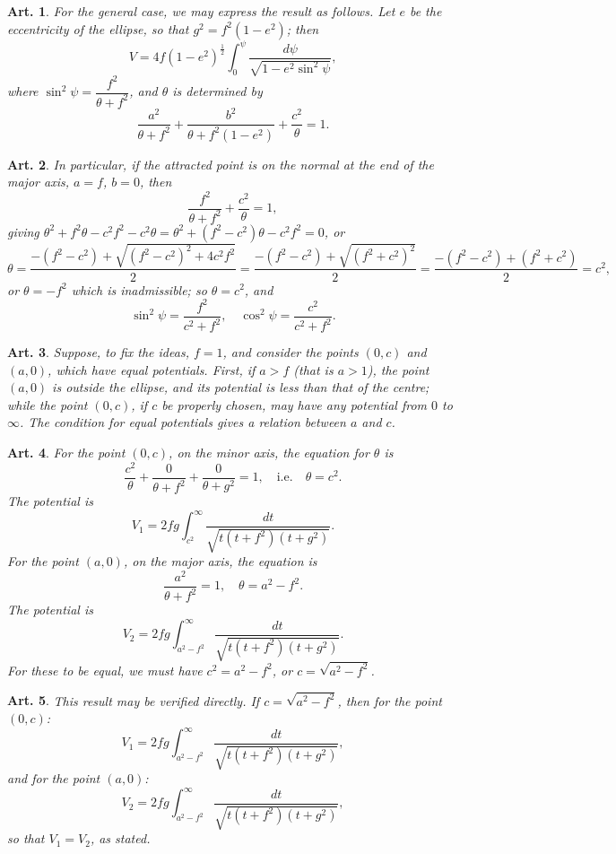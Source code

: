 \documentclass[12pt,a4paper]{article}
\theoremstyle{cayley}
\newtheorem{art}{Art.}[section]
\begin{document}
\begin{art}
For the general case, we may express the result as follows. Let $e$ be the eccentricity of the ellipse, so that $g^2 = f^2(1-e^2)$; then
\[
V = 4f(1-e^2)^{\frac{1}{2}}\int_0^{\psi} \frac{d\psi}{\sqrt{1 - e^2\sin^2\psi}},
\]
where $\sin^2\psi = \dfrac{f^2}{\theta + f^2}$, and $\theta$ is determined by
\[
\frac{a^2}{\theta + f^2} + \frac{b^2}{\theta + f^2(1-e^2)} + \frac{c^2}{\theta} = 1.
\]
\end{art}

\begin{art}
In particular, if the attracted point is on the normal at the end of the major axis, $a=f$, $b=0$, then
\[
\frac{f^2}{\theta + f^2} + \frac{c^2}{\theta} = 1,
\]
giving $\theta^2 + f^2\theta - c^2f^2 - c^2\theta = \theta^2 + (f^2-c^2)\theta - c^2f^2 = 0$, or
\[
\theta = \frac{-(f^2-c^2) + \sqrt{(f^2-c^2)^2 + 4c^2f^2}}{2}
= \frac{-(f^2-c^2) + \sqrt{(f^2+c^2)^2}}{2}
= \frac{-(f^2-c^2) + (f^2+c^2)}{2} = c^2,
\]
or $\theta = -f^2$ which is inadmissible; so $\theta = c^2$, and
\[
\sin^2\psi = \frac{f^2}{c^2 + f^2},
\quad
\cos^2\psi = \frac{c^2}{c^2 + f^2}.
\]
\end{art}

\begin{art}
Suppose, to fix the ideas, $f=1$, and consider the points $(0, c)$ and $(a, 0)$, which have equal potentials. First, if $a > f$ (that is $a > 1$), the point $(a, 0)$ is outside the ellipse, and its potential is less than that of the centre; while the point $(0, c)$, if $c$ be properly chosen, may have any potential from $0$ to $\infty$. The condition for equal potentials gives a relation between $a$ and $c$.
\end{art}

\begin{art}
For the point $(0, c)$, on the minor axis, the equation for $\theta$ is
\[
\frac{c^2}{\theta} + \frac{0}{\theta + f^2} + \frac{0}{\theta + g^2} = 1,
\quad \text{i.e.} \quad \theta = c^2.
\]
The potential is
\[
V_1 = 2fg\int_{c^2}^{\infty} \frac{dt}{\sqrt{t(t+f^2)(t+g^2)}}.
\]
For the point $(a, 0)$, on the major axis, the equation is
\[
\frac{a^2}{\theta + f^2} = 1,
\quad \theta = a^2 - f^2.
\]
The potential is
\[
V_2 = 2fg\int_{a^2-f^2}^{\infty} \frac{dt}{\sqrt{t(t+f^2)(t+g^2)}}.
\]
For these to be equal, we must have $c^2 = a^2 - f^2$, or $c = \sqrt{a^2 - f^2}$.
\end{art}

\begin{art}
This result may be verified directly. If $c = \sqrt{a^2 - f^2}$, then for the point $(0, c)$:
\[
V_1 = 2fg\int_{a^2-f^2}^{\infty} \frac{dt}{\sqrt{t(t+f^2)(t+g^2)}},
\]
and for the point $(a, 0)$:
\[
V_2 = 2fg\int_{a^2-f^2}^{\infty} \frac{dt}{\sqrt{t(t+f^2)(t+g^2)}},
\]
so that $V_1 = V_2$, as stated.
\end{art}
\end{document}
